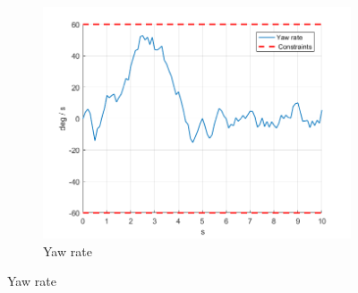 \documentclass[11pt]{article}
\begin{document}
\begin{enumerate}
\begin{figure}[ht]
\begin{subfigure}[c]{0.3\linewidth}
            \includegraphics[width=\linewidth]{Plots_09_OffsetFreeTracking_Constant/06}
            \caption{Yaw rate}
        \end{subfigure}


\end{figure}
\end{enumerate}
\end{document}
